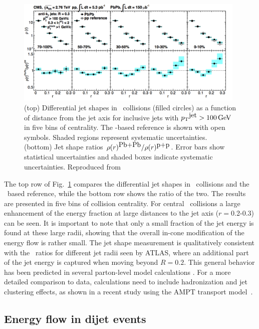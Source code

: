 \begin{figure}[!ht]
\begin{center}
\includegraphics[width=0.98\textwidth]{jetfigures/JetShapes_GR.png}
\caption{\label{fig:JSRatio}
(top) Differential jet shapes in \PbPb\ collisions (filled circles)
as a function of distance from the jet axis for inclusive jets with $\mbox{$p_{\mathrm{T}}$}^{\mbox{jet}} >100\,\mathrm{GeV}$
in five bins of centrality.  The \pp-based reference is shown with open symbols.
Shaded regions represent systematic uncertainties.
(bottom) Jet shape ratios $\rho(r)^{\mbox{Pb+Pb}}/\rho(r)^{\mbox{p+p}}$.
Error bars show statistical uncertainties and shaded boxes indicate systematic uncertainties. 
Reproduced from~\cite{Chatrchyan:2013kwa}}
\label{fig:GR:CMS_jetshapes}
\end{center}
\end{figure}

The top row of Fig.~\ref{fig:GR:CMS_jetshapes} compares the differential jet shapes in \PbPb\
collisions and the \pp\ based reference, while the bottom row shows the ratio of the two.
The results are presented in five bins of collision centrality.
For central \PbPb\ collisions a large enhancement of the energy fraction at large distances
to the jet axis ($r = $0.2-0.3) can be seen. It is important to note that only a small
fraction of the jet energy is found at these large radii, showing that the overall in-cone
modification of the energy flow is rather small.
The jet shape measurement is qualitatively consistent with the \Rcp\ ratios for different jet radii seen by ATLAS,
where an additional part of the jet energy is captured when moving beyond $R = 0.2$.
This general behavior has been predicted in several parton-level model 
calculations \cite{Vitev:2008rz,Renk:2009hv}.
For a more detailed comparison to data, calculations need to include hadronization and 
jet clustering effects, as shown in a recent study using the AMPT transport model~\cite{Ma:2013uqa}.

\subsection{Energy flow in dijet events}

